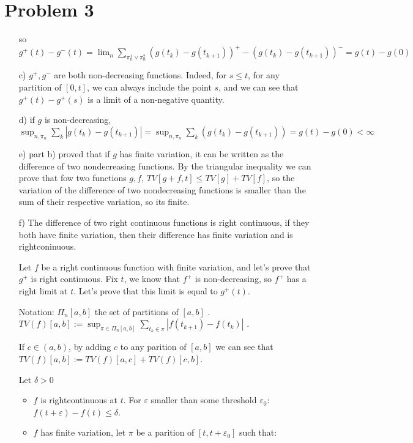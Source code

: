\documentclass[12pt]{article}
\newenvironment{problem}[1]
{\section*{Problem #1}}{}
\begin{document}
\begin{problem}{3}
\begin{enumerate}
      so $g^+(t) - g^-(t) =  \lim_n \sum_{\pi^1_n \vee \pi^2_n} (g(t_k) - g(t_{k+1}))^+ - (g(t_k) - g(t_{k+1}))^- = g(t) - g(0)$
      
    \item[c)] $g^+, g^-$ are both non-decreasing functions. Indeed, for $s \le t$, for any partition of $[0, t]$, we can always include the point $s$, and we can see that $g^+(t) - g^+(s)$ is a limit of a non-negative quantity.

      
    \item[d)] if $g$ is non-decreasing, $\sup_{n, \pi_n} \sum_{k} |g(t_k) - g(t_{k+1})| = \sup_{n, \pi_n} \sum_{k} (g(t_k) - g(t_{k+1})) = g(t)  - g(0) < \infty$
      
    \item[e)] part b) proved that if $g$ has finite variation, it can be written as the difference of two nondecreasing functions.
      By the triangular inequality we can prove that fow two functions $g, f$, $TV[g + f, t] \le TV[g] + TV[f]$, so the variation of the difference of two nondecreasing functions is smaller than the sum of their respective variation, so its finite.
      
    \item[f)] The difference of two right continuous functions is right continuous, if they both have finite variation, then their difference has finite variation and is rightconinuous.

      Let $f$ be a right continuous function with finite variation, and let's prove that $g^+$ is right continuous.
      Fix $t$, we know that $f^+$ is non-decreasing, so $f^+$ has a right limit at $t$. Let's prove that this limit is equal to $g^+(t)$.

      Notation: $\Pi_n[a, b]$ the set of partitions of $[a, b]$ .
      $TV(f)[a, b] := \sup_{\pi \in \Pi_n[a, b]} \sum_{t_k \in \pi} |f(t_{k+1}) - f(t_k)|$ .
      
      If $c \in (a, b)$, by adding $c$ to any parition of $[a, b]$ we can see that $TV(f)[a, b] := TV(f)[a, c] + TV(f)[c, b]$. 

      Let $\delta > 0$
      \begin{itemize}
      \item $f$ is rightcontinuous at $t$. For $\varepsilon$ smaller than some threshold $\varepsilon_0$: $f(t+\varepsilon) - f(t) \le \delta$.
        
      \item $f$ has finite variation, let
        $\pi$ be a parition of $[t, t+\varepsilon_0]$ such that:


\end{itemize}
\end{enumerate}
\end{problem}
\end{document}
